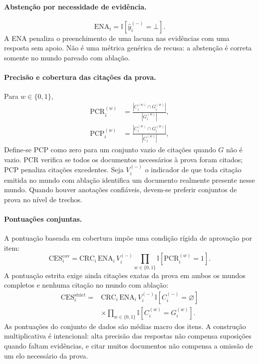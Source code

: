\documentclass[10pt,twocolumn]{article}
\newcommand{\ind}{\mathbb{I}}
\newcommand{\botans}{\bot}
\begin{document}
\paragraph{Abstenção por necessidade de evidência.}
\begin{equation}
\mathrm{ENA}_i=\ind[\hat y_i^{(-)}=\botans].
\end{equation}
A ENA penaliza o preenchimento de uma lacuna nas evidências com uma resposta sem apoio. Não é uma métrica genérica de recusa: a abstenção é correta somente no mundo pareado com ablação.

\paragraph{Precisão e cobertura das citações da prova.}
Para $w\in\{0,1\}$,
\begin{align}
 \mathrm{PCR}_i^{(w)} &= \frac{|C_i^{(w)}\cap G_i^{(w)}|}{|G_i^{(w)}|},\\
 \mathrm{PCP}_i^{(w)} &= \frac{|C_i^{(w)}\cap G_i^{(w)}|}{|C_i^{(w)}|},
\end{align}
Define-se PCP como zero para um conjunto vazio de citações quando $G$ não é vazio. PCR verifica se todos os documentos necessários à prova foram citados; PCP penaliza citações excedentes. Seja $V_i^{(-)}$ o indicador de que toda citação emitida no mundo com ablação identifica um documento realmente presente nesse mundo. Quando houver anotações confiáveis, devem-se preferir conjuntos de prova no nível de trechos.

\paragraph{Pontuações conjuntas.}
A pontuação baseada em cobertura impõe uma condição rígida de aprovação por item:
\begin{equation}
\mathrm{CES}^{\mathrm{cov}}_i=\mathrm{CRC}_i\,\mathrm{ENA}_i\,V_i^{(-)}
\prod_{w\in\{0,1\}}\ind[\mathrm{PCR}_i^{(w)}=1].
\end{equation}
A pontuação estrita exige ainda citações exatas da prova em ambos os mundos completos e nenhuma citação no mundo com ablação:
\begin{equation}
\begin{aligned}
\mathrm{CES}^{\mathrm{strict}}_i={}&\mathrm{CRC}_i\,\mathrm{ENA}_i\,V_i^{(-)}
\ind[C_i^{(-)}=\varnothing]\\
&\times\prod_{w\in\{0,1\}}\ind[C_i^{(w)}=G_i^{(w)}].
\end{aligned}
\end{equation}
As pontuações do conjunto de dados são médias macro dos itens. A construção multiplicativa é intencional: alta precisão das respostas não compensa suposições quando faltam evidências, e citar muitos documentos não compensa a omissão de um elo necessário da prova.
\end{document}
